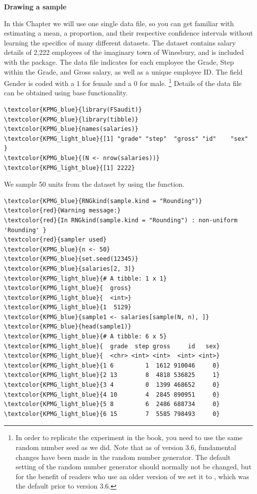 \begin{exercise}
\label{ex:sample}

\textbf{Drawing a sample}

In this Chapter we will use one single data file, so you can get familiar with estimating a mean, a proportion, and their respective confidence intervals without learning the specifics of many different datasets. The  dataset contains salary details of 2,222 employees of the imaginary town of Winesbury, and is included with the  package. The data file indicates for each employee the Grade, Step within the Grade, and Gross salary, as well as a unique employee ID. The field Gender is coded with a 1 for female and a 0 for male.
\footnote{In order to replicate the experiment in the book, you need to use the same random number seed as we did. Note that as of version 3.6, fundamental changes have been made in the random number generator. The default setting of the random number generator should normally not be changed, but for the benefit of readers who use an older version of  we set it to , which was the default prior to version 3.6.}
Details of the data file can be obtained using base  functionality.
\begin{Verbatim}[commandchars=\\\{\}]
\textcolor{KPMG_blue}{library(FSaudit)}
\textcolor{KPMG_blue}{library(tibble)}
\textcolor{KPMG_blue}{names(salaries)}
\textcolor{KPMG_light_blue}{[1] "grade" "step"  "gross" "id"    "sex"  }
\textcolor{KPMG_blue}{(N <- nrow(salaries))}
\textcolor{KPMG_light_blue}{[1] 2222}
\end{Verbatim}

We sample 50 units from the  dataset by using the  function.

\begin{Verbatim}[commandchars=\\\{\}]
\textcolor{KPMG_blue}{RNGkind(sample.kind = "Rounding")}
\textcolor{red}{Warning message:}
\textcolor{red}{In RNGkind(sample.kind = "Rounding") : non-uniform 'Rounding' }
\textcolor{red}{sampler used}
\textcolor{KPMG_blue}{n <- 50}
\textcolor{KPMG_blue}{set.seed(12345)}
\textcolor{KPMG_blue}{salaries[2, 3]}
\textcolor{KPMG_light_blue}{# A tibble: 1 x 1}
\textcolor{KPMG_light_blue}{  gross}
\textcolor{KPMG_light_blue}{  <int>}
\textcolor{KPMG_light_blue}{1  5129}
\textcolor{KPMG_blue}{sample1 <- salaries[sample(N, n), ]}
\textcolor{KPMG_blue}{head(sample1)}
\textcolor{KPMG_light_blue}{# A tibble: 6 x 5}
\textcolor{KPMG_light_blue}{  grade  step gross     id   sex}
\textcolor{KPMG_light_blue}{  <chr> <int> <int>  <int> <int>}
\textcolor{KPMG_light_blue}{1 6         1  1612 910046     0}
\textcolor{KPMG_light_blue}{2 13        8  4818 536825     1}
\textcolor{KPMG_light_blue}{3 4         0  1399 468652     0}
\textcolor{KPMG_light_blue}{4 10        4  2845 890951     0}
\textcolor{KPMG_light_blue}{5 8         6  2486 688734     0}
\textcolor{KPMG_light_blue}{6 15        7  5585 798493     0}
\end{Verbatim}

\end{exercise}

